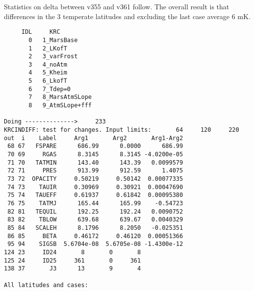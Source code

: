 \documentclass{article}
\begin{document}
Statistics on delta between v355 and v361 follow. The overall result is that differences in the 3 temperate latitudes and excluding the last case average 6 mK.

\begin{verbatim} 
     IDL     KRC
       0   1_MarsBase
       1   2_LKofT
       2   3_varFrost
       3   4_noAtm
       4   5_Kheim
       5   6_LkofT
       6   7_Tdep=0
       7   8_MarsAtmSLope
       8   9_AtmSLope+fff 

Doing -------------->     233
KRCINDIFF: test for changes. Input limits:       64     120     220
out  i    Label     Arg1       Arg2       Arg1-Arg2
 68 67   FSPARE      686.99      0.0000      686.99
 70 69     RGAS      8.3145      8.3145 -4.0200e-05
 71 70   TATMIN      143.40      143.39   0.0099579
 72 71     PRES      913.99      912.59      1.4075
 73 72  OPACITY     0.50219     0.50142  0.00077335
 74 73    TAUIR     0.30969     0.30921  0.00047690
 75 74   TAUEFF     0.61937     0.61842  0.00095380
 76 75    TATMJ      165.44      165.99    -0.54723
 82 81   TEQUIL      192.25      192.24   0.0090752
 83 82    TBLOW      639.68      639.67   0.0040329
 85 84   SCALEH      8.1796      8.2050   -0.025351
 86 85     BETA     0.46172     0.46120  0.00051366
 95 94    SIGSB  5.6704e-08  5.6705e-08 -1.4300e-12
124 23     ID24       8       0       8
125 24     ID25     361       0     361
138 37       J3      13       9       4

All latitudes and cases:


\end{verbatim}
\end{document}
